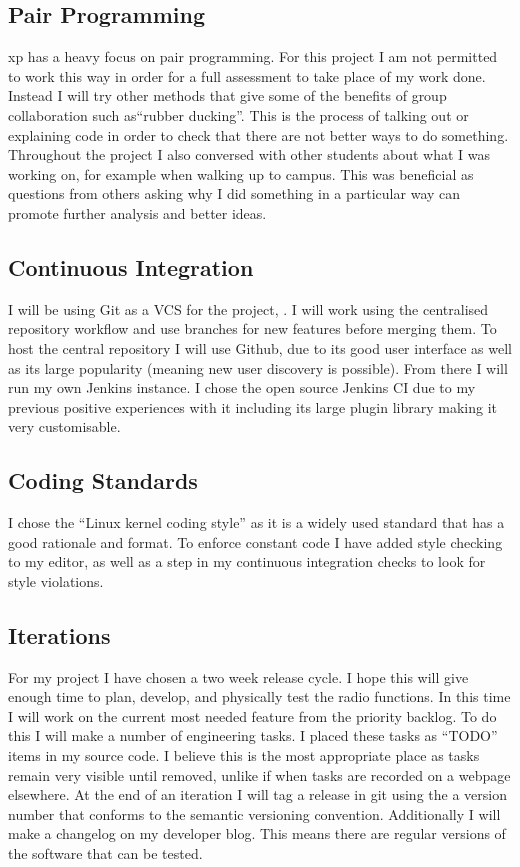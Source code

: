 
\subsection*{Pair Programming}
\gls{xp} has a heavy focus on pair programming. For this project I am not permitted to work this way in order for a full assessment to take place of my work done. Instead I will try other methods that give some of the benefits of group collaboration such as``rubber ducking''. This is the process of talking out or explaining code in order to check that there are not better ways to do something. Throughout the project I also conversed with other students about what I was working on, for example when walking up to campus. This was beneficial as questions from others asking why I did something in a particular way can promote further analysis and better ideas.

\subsection*{Continuous Integration}
I will be using Git as a VCS for the project, . I will work using the centralised repository workflow and use branches for new features before merging them. To host the central repository I will use Github, due to its good user interface as well as its large popularity (meaning new user discovery is possible). From there I will run my own Jenkins  instance. I chose the open source Jenkins CI due to my previous positive experiences with it including its large plugin library making it very customisable. 

\subsection*{Coding Standards}	
I chose the ``Linux kernel coding style''\cite{linux_coding_style} as it is a widely used standard that has a good rationale and format. To enforce constant code I have added style checking to my editor, as well as a step in my continuous integration checks to look for style violations.

\subsection*{Iterations}
For my project I have chosen a two week release cycle. I hope this will give enough time to plan, develop, and physically test the radio functions. In this time I will work on the current most needed feature from the priority backlog. To do this I will make a number of engineering tasks. I placed these tasks as ``TODO'' items in my source code. I believe this is the most appropriate place as tasks remain very visible until removed, unlike if when tasks are recorded on a webpage elsewhere.  At the end of an iteration I will tag a release in git using the a version number that conforms to the semantic versioning convention\cite{sem_ver}. Additionally I will make a changelog on my developer blog. This means there are regular versions of the software that can be tested.
